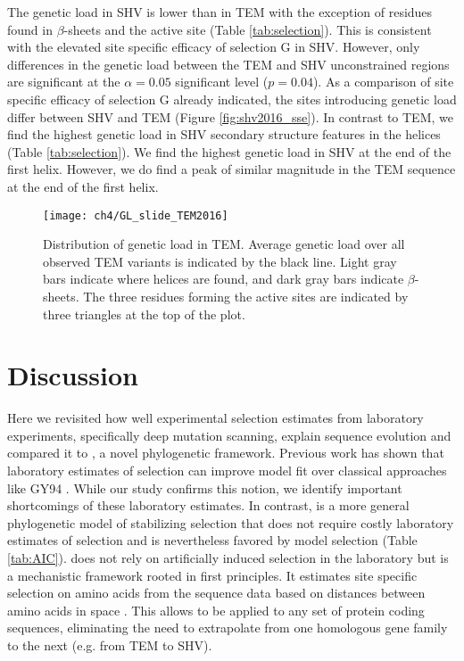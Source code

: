 The genetic load in SHV is lower than in TEM with the exception of residues found in $\beta$-sheets and the active site (Table \ref{tab:selection}).
This is consistent with the elevated site specific efficacy of selection G in SHV.
However, only differences in the genetic load between the TEM and SHV unconstrained regions are significant at the $\alpha = 0.05$ significant level ($p = 0.04$).
As a comparison of site specific efficacy of selection G already indicated, the sites introducing genetic load differ between SHV and TEM (Figure \ref{fig:shv2016_sse}).
In contrast to TEM, we find the highest genetic load in SHV secondary structure features in the helices (Table \ref{tab:selection}).
We find the highest genetic load in SHV at the end of the first helix.
However, we do find a peak of similar magnitude in the TEM sequence at the end of the first helix.

\begin{figure}[H]
     \centering
	\texttt{[image: ch4/GL\_slide\_TEM2016]}
	\caption{Distribution of genetic load in TEM. 
	Average genetic load over all observed TEM variants is indicated by the black line. 
	Light gray bars indicate where helices are found, and dark gray bars indicate $\beta$-sheets.
	The three residues forming the active sites are indicated by three triangles at the top of the plot.}
	\label{fig:tem2016_sse}
\end{figure}

\section{Discussion}

Here we revisited how well experimental selection estimates from laboratory experiments, specifically deep mutation scanning, explain sequence evolution and compared it to \selac, a novel phylogenetic framework.
Previous work has shown that laboratory estimates of selection can improve model fit over classical approaches like GY94 \citep{bloom2014, bloom2017}.
While our study confirms this notion, we identify important shortcomings of these laboratory estimates.
In contrast, \selac is a more general phylogenetic model of stabilizing selection that does not require costly laboratory estimates of selection and is nevertheless favored by model selection (Table \ref{tab:AIC}).
\selac does not rely on artificially induced selection in the laboratory but is a mechanistic framework rooted in first principles.
It estimates site specific selection on amino acids from the sequence data based on distances between amino acids in \PC space \citep{grantham1974,beaulieu2018}.
This allows \selac to be applied to any set of protein coding sequences, eliminating the need to extrapolate from one homologous gene family to the next (e.g. from TEM to SHV).

